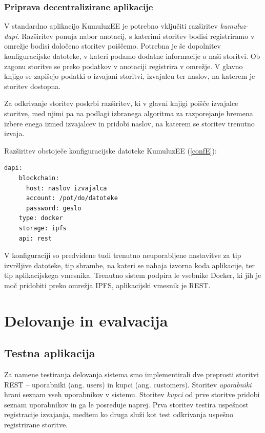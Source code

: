 \documentclass[a4paper, 12pt]{book}
\begin{document}
\subsection{Priprava decentralizirane aplikacije}
V standardno aplikacijo KumuluzEE je potrebno vključiti razširitev \textit{kumuluz-dapi}. 
Razširitev ponuja nabor anotacij, s katerimi storitev bodisi registriramo v omrežje bodisi določeno storitev poiščemo.
Potrebna je še dopolnitev konfiguracijske datoteke, v kateri podamo dodatne informacije o naši storitvi.
Ob zagonu storitve se preko podatkov v anotaciji registrira v omrežje.
V glavno knjigo se zapišejo podatki o izvajani storitvi, izvajalcu ter naslov, na katerem je storitev dostopna.

Za odkrivanje storitev poskrbi razširitev, ki v glavni knjigi poišče izvajalce storitve, med njimi pa na podlagi izbranega algoritma za razporejanje bremena izbere enega izmed izvajalcev in pridobi naslov, na katerem se storitev trenutno izvaja.

Razširitev obstoječe konfiguracijske datoteke KumuluzEE (\ref{confE}):
\begin{lstlisting}[caption={Razširitev konfiguracijske datoteke},captionpos=b,label={confE}]
  dapi:
    blockchain:
      host: naslov izvajalca
      account: /pot/do/datoteke
      password: geslo
    type: docker
    storage: ipfs
    api: rest
\end{lstlisting}

V konfiguraciji so predvidene tudi trenutno neuporabljene nastavitve za tip izvršljive datoteke, tip shrambe, na kateri se nahaja izvorna koda aplikacije, ter tip aplikacijskega vmesnika.
Trenutno sistem podpira le vsebnike Docker, ki jih je moč pridobiti preko omrežja IPFS, aplikacijski vmesnik je REST.


\chapter{Delovanje in evalvacija}

\section{Testna aplikacija}

Za namene testiranja delovanja sistema smo implementirali dve preprosti storitvi REST -- uporabniki (ang. users) in kupci (ang. customers).
Storitev \textit{uporabniki} hrani seznam vseh uporabnikov v sistemu.
Storitev \textit{kupci} od prve storitve pridobi seznam uporabnikov in ga le posreduje naprej.
Prva storitev testira uspešnost registracije izvajanja, medtem ko druga služi kot test odkrivanja uspešno registrirane storitve.
\end{document}
